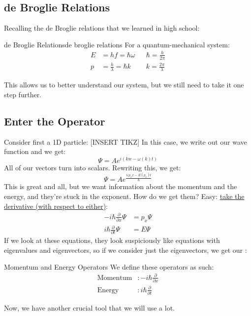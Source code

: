           \subsection{de Broglie Relations}
              Recalling the de Broglie relations that we learned in high school:
              \begin{theorem}{de Broglie Relations}{de broglie relations}
                  For a quantum-mechanical system:
                  \begin{align*}
                      E &= hf = \hbar \omega &&\hbar = \frac{h}{2\pi}\\
                      p &= \frac{h}{\lambda} = \hbar k && k = \frac{2\pi}{\lambda}
                  \end{align*}
              \end{theorem}
              This allows us to better understand our system, but we still need to take it one step further.

          \subsection{Enter the Operator}
              Consider first a 1D particle: [INSERT TIKZ]
              In this case, we write out our wave function and we get:
              $$\Psi = Ae^{i(kw - \omega(k)t)}$$
              All of our vectors turn into scalars. Rewriting this, we get:
              $$\Psi = Ae^{\frac{i(p_xx - E(p_x)t}{\hbar}}$$
              This is great and all, but we want information about the momentum and the energy, and they're stuck in the exponent. How do we get them? Easy: \underline{take the derivative (with respect to either)}:
              \begin{align*}
                  -i\hbar\frac{\partial}{\partial x}\Psi &= p_x\Psi\\
                  i\hbar\frac{\partial}{\partial t}\Psi &= E\Psi
              \end{align*}
              If we look at these equations, they look suspiciously like equations with eigenvalues and eigenvectors, so if we consider just the eigenvectors, we get our :
              \begin{definition}{Momentum and Energy Operators}
                  We define these operators as such:
                  \begin{align*}
                      \text{Momentum}&: -i\hbar\frac{\partial}{\partial x}\\
                      \text{Energy}&: i\hbar\frac{\partial}{\partial t}
                  \end{align*}
              \end{definition}
              Now, we have another crucial tool that we will use a lot.

